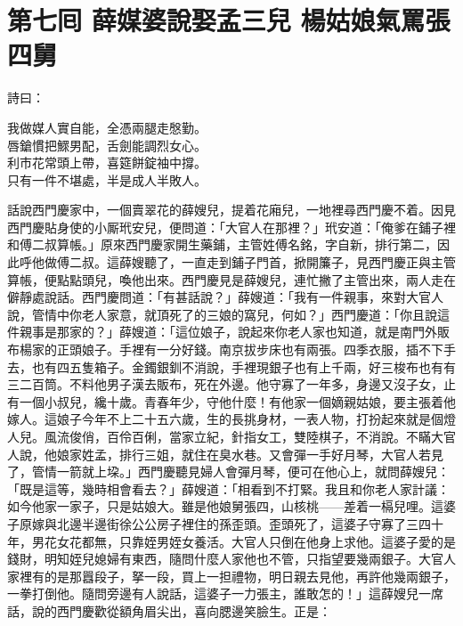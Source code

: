 
\chapter*{第七囘 薛媒婆說娶孟三兒 楊姑娘氣罵張四舅}


詩曰：

\begin{myquote} 
我做媒人實自能，全憑兩腿走慇勤。\\唇鎗慣把鰥男配，舌劍能調烈女心。\\利市花常頭上帶，喜筵餅錠袖中撐。\\只有一件不堪處，半是成人半敗人。
\end{myquote} 

話說西門慶家中，一個賣翠花的薛嫂兒，提着花廂兒，一地裡尋西門慶不着。因見西門慶貼身使的小厮玳安兒，便問道：「大官人在那裡？」玳安道：「俺爹在鋪子裡和傅二叔算帳。」原來西門慶家開生藥鋪，主管姓傅名銘，字自新，排行第二，因此呼他做傅二叔。這薛嫂聽了，一直走到鋪子門首，掀開簾子，見西門慶正與主管算帳，便點點頭兒，喚他出來。西門慶見是薛嫂兒，連忙撇了主管出來，兩人走在僻靜處說話。西門慶問道：「有甚話說？」薛嫂道：「我有一件親事，來對大官人說，管情中你老人家意，就頂死了的三娘的窩兒，{}何如？」西門慶道：「你且說這件親事是那家的？」薛嫂道：「這位娘子，說起來你老人家也知道，就是南門外販布楊家的正頭娘子。手裡有一分好錢。南京拔步床也有兩張。四季衣服，插不下手去，也有四五隻箱子。金鐲銀釧不消說，手裡現銀子也有上千兩，好三梭布也有有三二百筒。不料他男子漢去販布，死在外邊。他守寡了一年多，身邊又沒子女，止有一個小叔兒，纔十歲。青春年少，守他什麼！有他家一個嫡親姑娘，要主張着他嫁人。這娘子今年不上二十五六歲，{}生的長挑身材，一表人物，打扮起來就是個燈人兒。風流俊俏，百伶百俐，當家立紀，針指女工，雙陸棋子，不消說。不瞞大官人說，{}他娘家姓孟，排行三姐，就住在臭水巷。{}又會彈一手好月琴，大官人若見了，管情一箭就上垜。」西門慶聽見婦人會彈月琴，便可在他心上，就問薛嫂兒：「既是這等，幾時相會看去？」薛嫂道：「相看到不打緊。我且和你老人家計議：{}如今他家一家子，只是姑娘大。雖是他娘舅張四，山核桃——差着一槅兒哩。這婆子原嫁與北邊半邊街徐公公房子裡住的孫歪頭。{}歪頭死了，這婆子守寡了三四十年，男花女花都無，只靠姪男姪女養活。大官人只倒在他身上求他。這婆子愛的是錢財，明知姪兒媳婦有東西，隨問什麼人家他也不管，只指望要幾兩銀子。大官人家裡有的是那囂段子，拏一段，買上一担禮物，明日親去見他，再許他幾兩銀子，一拳打倒他。{}隨問旁邊有人說話，這婆子一力張主，誰敢怎的！」這薛嫂兒一席話，說的西門慶歡從額角眉尖出，喜向腮邊笑臉生。正是：

